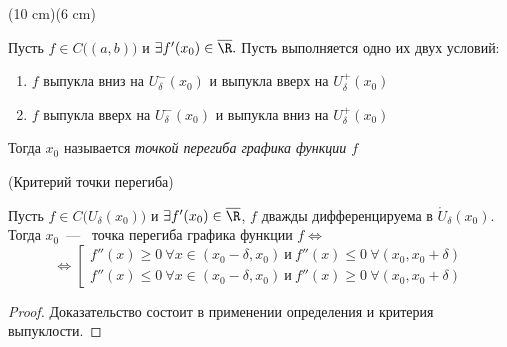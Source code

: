 \sidefig(10 cm)(6 cm)	
{\begin{flushleft}
\normalsize{		
\begin{definition}
	 Пусть $f\in C\Big((a, b)\Big)$ и $\exists f'(x_{0}) \in \overline{\R}.$ Пусть выполняется одно их двух условий: \begin{enumerate}
		\item $f$ выпукла вниз на $U_{\delta}^{-}(x_{0})$ и выпукла вверх на $U_{\delta}^{+}(x_{0})$
		\item $f$ выпукла вверх на $U_{\delta}^{-}(x_{0})$ и выпукла вниз на  $U_{\delta}^{+}(x_{0})$
	\end{enumerate}
	
	Тогда $x_{0}$ называется \textit{точкой перегиба графика функции $f$}
\end{definition}}
\end{flushleft}}
{
}

\begin{theorem}
	\hypertarget{thrm5.27}{(Критерий точки перегиба)} Пусть $f \in C\Big(U_{\delta}(x_{0})\Big)$ и $\exists f'(x_{0}) \in \overline{\R}$, $f$ дважды дифференцируема в $\mathring{U}_{\delta}(x_{0}).$ Тогда $x_{0}$~---~ точка перегиба графика функции $f\Leftrightarrow$ $$\Leftrightarrow \left[\begin{gathered}
	f''(x) \geq 0\ \forall x\in (x_{0} - \delta, x_{0}) \ \textrm{и} \ f''(x) \leq 0 \ \forall (x_{0}, x_{0} + \delta) \\
	f''(x) \leq 0\ \forall x\in (x_{0} - \delta, x_{0}) \ \textrm{и} \ f''(x) \geq 0 \ \forall (x_{0}, x_{0} + \delta) 
	\end{gathered}\right.$$
\end{theorem}
\begin{proof}
	Доказательство состоит в применении определения и критерия выпуклости.
\end{proof}

